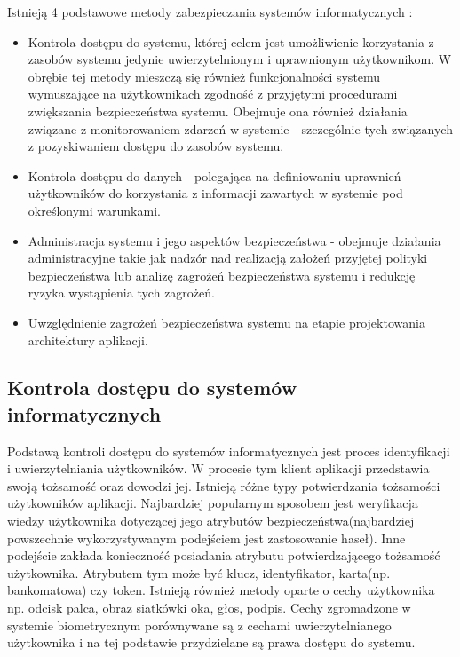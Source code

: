 Istnieją 4 podstawowe metody zabezpieczania systemów informatycznych \cite{Russell91}:

\begin{itemize}
	\item Kontrola dostępu do systemu, której celem jest umożliwienie korzystania z zasobów systemu jedynie uwierzytelnionym i uprawnionym użytkownikom. W obrębie tej metody mieszczą się również funkcjonalności systemu wymuszające na użytkownikach zgodność z przyjętymi procedurami zwiększania bezpieczeństwa systemu. Obejmuje ona również działania związane z monitorowaniem zdarzeń w systemie - szczególnie tych związanych z pozyskiwaniem dostępu do zasobów systemu. 
	\item Kontrola dostępu do danych - polegająca na definiowaniu uprawnień użytkowników do korzystania z informacji zawartych w systemie pod określonymi warunkami.
	\item Administracja systemu i jego aspektów bezpieczeństwa - obejmuje działania administracyjne takie jak nadzór nad realizacją założeń przyjętej polityki bezpieczeństwa lub analizę zagrożeń bezpieczeństwa systemu i redukcję ryzyka wystąpienia tych zagrożeń. 
	\item Uwzględnienie zagrożeń bezpieczeństwa systemu na etapie projektowania architektury aplikacji. 
\end{itemize} 
		
\subsection{Kontrola dostępu do systemów informatycznych}

	Podstawą kontroli dostępu do systemów informatycznych jest proces identyfikacji i uwierzytelniania użytkowników. W procesie tym klient aplikacji przedstawia swoją tożsamość oraz dowodzi jej. Istnieją różne typy potwierdzania tożsamości użytkowników aplikacji. Najbardziej popularnym sposobem jest weryfikacja wiedzy użytkownika dotyczącej jego atrybutów bezpieczeństwa(najbardziej powszechnie wykorzystywanym podejściem jest zastosowanie haseł). Inne podejście zakłada konieczność posiadania atrybutu potwierdzającego tożsamość użytkownika. Atrybutem tym może być klucz, identyfikator, karta(np. bankomatowa) czy token. Istnieją również metody oparte o cechy użytkownika np. odcisk palca, obraz siatkówki oka, głos, podpis. Cechy zgromadzone w systemie biometrycznym porównywane są z cechami uwierzytelnianego użytkownika i na tej podstawie przydzielane są prawa dostępu do systemu.

